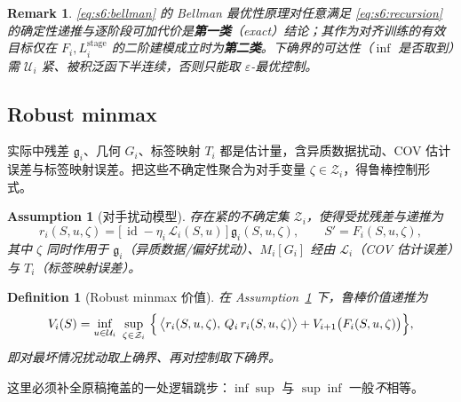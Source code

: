 \documentclass[11pt,a4paper]{article}
\newtheorem{definition}[theorem]{Definition}
\newtheorem{remark}[theorem]{Remark}
\newtheorem{assumption}[theorem]{Assumption}
\DeclareMathOperator{\id}{id}
\newcommand{\cL}{\mathcal{L}}   %
\newcommand{\cU}{\mathcal{U}}   %
\newcommand{\cZ}{\mathcal{Z}}
\newcommand{\gres}{\bm{\mathfrak{g}}} %
\begin{document}
\begin{remark}\label{rem:s6:tier-bellman}
\eqref{eq:s6:bellman} 的 Bellman 最优性原理对任意满足 \eqref{eq:s6:recursion} 的确定性递推与逐阶段可加代价是\textbf{第一类}（exact）结论；其作为对齐训练的有效目标仅在 $F_i,L_i^{\mathrm{stage}}$ 的二阶建模成立时为\textbf{第二类}。下确界的可达性（$\inf$ 是否取到）需 $\cU_i$ 紧、被积泛函下半连续，否则只能取 $\varepsilon$-最优控制。
\end{remark}

\subsection{Robust minmax}

实际中残差 $\gres_i$、几何 $G_i$、标签映射 $T_i$ 都是估计量，含异质数据扰动、COV 估计误差与标签映射误差。把这些不确定性聚合为对手变量 $\zeta\in\cZ_i$，得鲁棒控制形式。

\begin{assumption}[对手扰动模型]\label{asm:s6:adversary}
存在紧的不确定集 $\cZ_i$，使得受扰残差与递推为
\begin{equation}\label{eq:s6:perturbed}
r_i(S,u,\zeta)=\bigl[\,\id-\eta_i\,\cL_i(S,u)\,\bigr]\,\gres_i(S,u,\zeta),\qquad S'=F_i(S,u,\zeta),
\end{equation}
其中 $\zeta$ 同时作用于 $\gres_i$（异质数据/偏好扰动）、$M_i[G_i]$ 经由 $\cL_i$（COV 估计误差）与 $T_i$（标签映射误差）。
\end{assumption}

\begin{definition}[Robust minmax 价值]\label{def:s6:minmax}
在 Assumption~\ref{asm:s6:adversary} 下，鲁棒价值递推为
\begin{equation}\label{eq:s6:minmax}
V_i(S)=\inf_{u\in\cU_i}\ \sup_{\zeta\in\cZ_i}\ \Bigl\{\,\bigl\langle r_i(S,u,\zeta),\,Q_i\,r_i(S,u,\zeta)\bigr\rangle+V_{i+1}\bigl(F_i(S,u,\zeta)\bigr)\Bigr\},
\end{equation}
即对最坏情况扰动取上确界、再对控制取下确界。
\end{definition}

这里必须补全原稿掩盖的一处逻辑跳步：$\inf\sup$ 与 $\sup\inf$ 一般\emph{不}相等。
\end{document}
